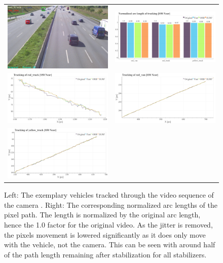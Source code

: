 \begin{figure}[!ht]
  \centering
  \begin{tabular}{cc}
    \includegraphics[width=0.45\linewidth]{diagrams/object_tracking/s50_s_near/frame.png}    &  
    \includegraphics[width=0.475\linewidth]{diagrams/object_tracking/s50_s_near/arcs.png}    \\

    \includegraphics[width=0.475\linewidth]{diagrams/object_tracking/s50_s_near/red_truck.png}    &  
    \includegraphics[width=0.475\linewidth]{diagrams/object_tracking/s50_s_near/red_van.png}    \\  
    \includegraphics[width=0.475\linewidth]{diagrams/object_tracking/s50_s_near/yellow_truck.png}   
  \end{tabular}
  \caption{Left: 
  The exemplary vehicles tracked through the video sequence of the camera . 
  Right:
  The corresponding normalized arc lengths of the pixel path. 
  The length is normalized by the original arc length, hence the 1.0 factor for the original video. 
  As the jitter is removed, the pixels movement is lowered significantly as it does only move with the vehicle, not the camera.
  This can be seen with around half of the path length remaining after stabilization for all stabilizers.
  }
  \label{fig:object_tracking_appendix_s50_s_near}
\end{figure}

